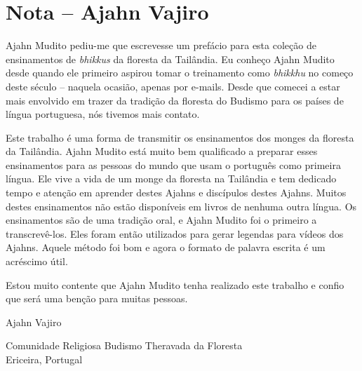 
\chapter{Nota -- Ajahn Vajiro}

Ajahn Mudito pediu-me que escrevesse um prefácio para esta coleção
de ensinamentos de \textit{bhikkus} da floresta da Tailândia. Eu
conheço Ajahn Mudito desde quando ele primeiro aspirou tomar o
treinamento como \textit{bhikkhu} no começo deste século – naquela
ocasião, apenas por e-mails. Desde que comecei a estar mais envolvido
em trazer da tradição da floresta do Budismo para os países de língua
portuguesa, nós tivemos mais contato.

Este trabalho é uma forma de transmitir os ensinamentos dos monges
da floresta da Tailândia. Ajahn Mudito está muito bem qualificado a
preparar esses ensinamentos para as pessoas do mundo que usam o
português como primeira língua. Ele vive a vida de um monge da floresta
na Tailândia e tem dedicado tempo e atenção em aprender destes Ajahns e
discípulos destes Ajahns. Muitos destes ensinamentos não estão
disponíveis em livros de nenhuma outra língua. Os ensinamentos são de
uma tradição oral, e Ajahn Mudito foi o primeiro a transcrevê-los. Eles
foram então utilizados para gerar legendas para vídeos dos Ajahns.
Aquele método foi bom e agora o formato de palavra escrita é um
acréscimo útil.

Estou muito contente que Ajahn Mudito tenha realizado este trabalho
e confio que será uma benção para muitas pessoas.

\bigskip

{\raggedleft
Ajahn Vajiro

Comunidade Religiosa Budismo Theravada da Floresta\\
Ericeira, Portugal
\par}

